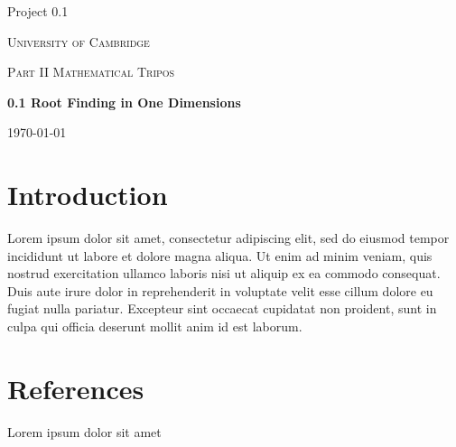 \documentclass{article}
\begin{document}
    \begin{titlepage}
        \begin{flushleft}
            Project 0.1
        \end{flushleft}
        \vfill
        \centering
        {\scshape\LARGE University of Cambridge \par}
        \vspace{1cm}
        {\scshape\Large Part II Mathematical Tripos \par}
        \vspace{1.5cm}
        {\huge\bfseries 0.1 Root Finding in One Dimensions \par}
        \vspace{2cm}

        \vfill
        {\large \today\par}
    \end{titlepage}
  
  \section{Introduction}
  
  Lorem ipsum dolor sit amet, consectetur adipiscing elit, sed do eiusmod tempor incididunt ut labore et dolore magna aliqua. Ut enim ad minim veniam, quis nostrud exercitation ullamco laboris nisi ut aliquip ex ea commodo consequat. Duis aute irure dolor in reprehenderit in voluptate velit esse cillum dolore eu fugiat nulla pariatur. Excepteur sint occaecat cupidatat non proident, sunt in culpa qui officia deserunt mollit anim id est laborum. \cite{xu}

  \newpage
  \clearpage
  \section{References}
  \begingroup
    \renewcommand{\section}[2]{}
    
    
  \endgroup


  \newpage
  \section{Appendix}
    \subsection{Lorem ipsum dolor sit amet}
    \label{testRK4}
\end{document}
